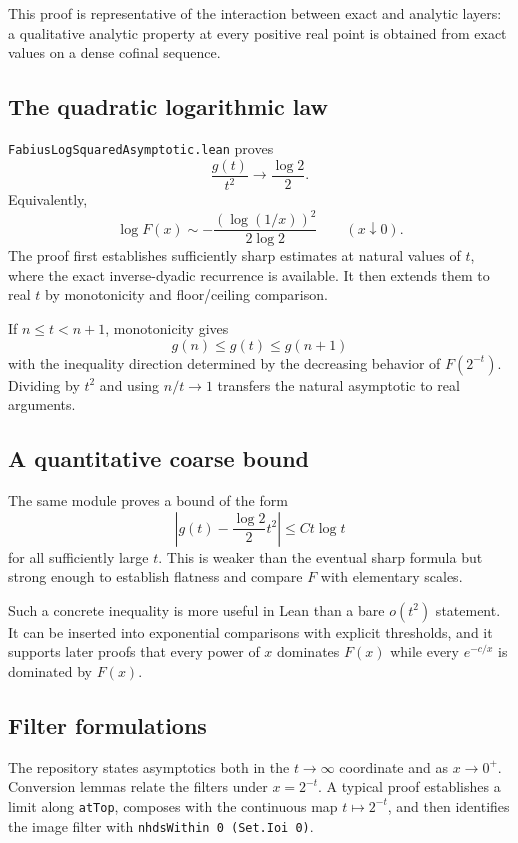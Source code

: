 \documentclass[11pt,oneside]{article}
\theoremstyle{definition}
\theoremstyle{remark}
\begin{document}
This proof is representative of the interaction between exact and analytic layers: a qualitative analytic property at every positive real point is obtained from exact values on a dense cofinal sequence.

\subsection{The quadratic logarithmic law}
\nolinkurl{FabiusLogSquaredAsymptotic.lean} proves
\[
  \frac{g(t)}{t^2}\longrightarrow\frac{\log2}{2}.
\]
Equivalently,
\[
  \log F(x)
  \sim-\frac{(\log(1/x))^2}{2\log2}
  \qquad(x\downarrow0).
\]
The proof first establishes sufficiently sharp estimates at natural values of \(t\), where the exact inverse-dyadic recurrence is available.  It then extends them to real \(t\) by monotonicity and floor/ceiling comparison.

If \(n\leq t<n+1\), monotonicity gives
\[
  g(n)\leq g(t)\leq g(n+1)
\]
with the inequality direction determined by the decreasing behavior of \(F(2^{-t})\).  Dividing by \(t^2\) and using \(n/t\to1\) transfers the natural asymptotic to real arguments.

\subsection{A quantitative coarse bound}
The same module proves a bound of the form
\[
  \left|g(t)-\frac{\log2}{2}t^2\right|
  \leq C t\log t
\]
for all sufficiently large \(t\).  This is weaker than the eventual sharp formula but strong enough to establish flatness and compare \(F\) with elementary scales.

Such a concrete inequality is more useful in Lean than a bare \(o(t^2)\) statement.  It can be inserted into exponential comparisons with explicit thresholds, and it supports later proofs that every power of \(x\) dominates \(F(x)\) while every \(e^{-c/x}\) is dominated by \(F(x)\).

\subsection{Filter formulations}
The repository states asymptotics both in the \(t\to\infty\) coordinate and as \(x\to0^+\).  Conversion lemmas relate the filters under \(x=2^{-t}\).  A typical proof establishes a limit along \nolinkurl{atTop}, composes with the continuous map \(t\mapsto2^{-t}\), and then identifies the image filter with \nolinkurl{nhdsWithin 0 (Set.Ioi 0)}.
\end{document}
